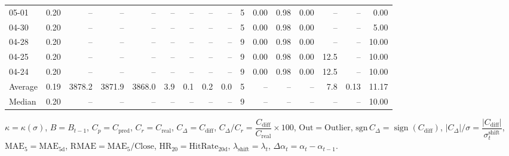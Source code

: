 \begin{threeparttable}
{\begin{tabular}{lrrrrrrrrrrrrrrr}
  05-01 &     0.20 &     -- &     -- &     -- &         -- &             -- &                       -- &                  -- &              5 &       0.00 &      0.98 &           0.00 &               -- &              -- &                   0.00 \\
  04-30 &     0.20 &     -- &     -- &     -- &         -- &             -- &                       -- &                  -- &              5 &       0.00 &      0.98 &           0.00 &               -- &              -- &                   5.00 \\
  04-28 &     0.20 &     -- &     -- &     -- &         -- &             -- &                       -- &                  -- &              9 &       0.00 &      0.98 &           0.00 &               -- &              -- &                  10.00 \\
  04-25 &     0.20 &     -- &     -- &     -- &         -- &             -- &                       -- &                  -- &              9 &       0.00 &      0.98 &           0.00 &             12.5 &              -- &                  10.00 \\
  04-24 &     0.20 &     -- &     -- &     -- &         -- &             -- &                       -- &                  -- &              9 &       0.00 &      0.98 &           0.00 &             12.5 &              -- &                  10.00 \\
Average &     0.19 & 3878.2 & 3871.9 & 3868.0 &        3.9 &            0.1 &                      0.2 &                 0.0 &              5 &         -- &        -- &             -- &              7.8 &            0.13 &                  11.17 \\
 Median &     0.20 &     -- &     -- &     -- &         -- &             -- &                       -- &                  -- &              9 &         -- &        -- &             -- &               -- &              -- &                  10.00 \\
\bottomrule
\end{tabular}
}
\begin{tablenotes}\footnotesize
\item $\kappa=\kappa(\sigma)$, $B=B_{t-1}$, $C_p=C_{\text{pred}}$, $C_r=C_{\text{real}}$, $C_\Delta=C_{\text{diff}}$, $C_\Delta/C_r=\dfrac{C_{\text{diff}}}{C_{\text{real}}}\times100$, $\mathrm{Out}=\text{Outlier}$, $\mathrm{sgn}\,C_\Delta=\operatorname{sign}(C_{\text{diff}})$, $|C_\Delta|/\sigma=\dfrac{|C_{\text{diff}}|}{\sigma_t^{\text{shift}}}$, $\mathrm{MAE}_5=\mathrm{MAE}_{5\text{d}}$, $\mathrm{RMAE}= \mathrm{MAE}_5 / \text{Close}$, $\mathrm{HR}_{20}=\mathrm{HitRate}_{20\text{d}}$, 
$\lambda_{\text{shift}}=\lambda_t$, 
$\Delta\alpha_t=\alpha_t-\alpha_{t-1}$.
\end{tablenotes}
\end{threeparttable}
\endgroup

